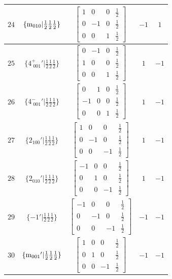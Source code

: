 \documentclass[fleqn,8pt]{jsarticle}
\begin{document}
\begin{longtable}{ccccc}
$ 24 $ & $ \{{\rm m}_{010}|\frac{1}{2} \frac{1}{2} \frac{1}{2}\} $ & $ \begin{bmatrix} 1 & 0 & 0 & \frac{1}{2} \\ 0 & -1 & 0 & \frac{1}{2} \\ 0 & 0 & 1 & \frac{1}{2} \end{bmatrix} $ & $ -1 $ & $ 1 $ \\ \hline
$ 25 $ & $ \{4^{+}_{\,\,001}{}'|\frac{1}{2} \frac{1}{2} \frac{1}{2}\} $ & $ \begin{bmatrix} 0 & -1 & 0 & \frac{1}{2} \\ 1 & 0 & 0 & \frac{1}{2} \\ 0 & 0 & 1 & \frac{1}{2} \end{bmatrix} $ & $ 1 $ & $ -1 $ \\ \hline
$ 26 $ & $ \{4^{-}_{\,\,001}{}'|\frac{1}{2} \frac{1}{2} \frac{1}{2}\} $ & $ \begin{bmatrix} 0 & 1 & 0 & \frac{1}{2} \\ -1 & 0 & 0 & \frac{1}{2} \\ 0 & 0 & 1 & \frac{1}{2} \end{bmatrix} $ & $ 1 $ & $ -1 $ \\ \hline
$ 27 $ & $ \{2{}_{100}{}'|\frac{1}{2} \frac{1}{2} \frac{1}{2}\} $ & $ \begin{bmatrix} 1 & 0 & 0 & \frac{1}{2} \\ 0 & -1 & 0 & \frac{1}{2} \\ 0 & 0 & -1 & \frac{1}{2} \end{bmatrix} $ & $ 1 $ & $ -1 $ \\ \hline
$ 28 $ & $ \{2{}_{010}{}'|\frac{1}{2} \frac{1}{2} \frac{1}{2}\} $ & $ \begin{bmatrix} -1 & 0 & 0 & \frac{1}{2} \\ 0 & 1 & 0 & \frac{1}{2} \\ 0 & 0 & -1 & \frac{1}{2} \end{bmatrix} $ & $ 1 $ & $ -1 $ \\ \hline
$ 29 $ & $ \{-1{}'|\frac{1}{2} \frac{1}{2} \frac{1}{2}\} $ & $ \begin{bmatrix} -1 & 0 & 0 & \frac{1}{2} \\ 0 & -1 & 0 & \frac{1}{2} \\ 0 & 0 & -1 & \frac{1}{2} \end{bmatrix} $ & $ -1 $ & $ -1 $ \\ \hline
$ 30 $ & $ \{{\rm m}_{001}{}'|\frac{1}{2} \frac{1}{2} \frac{1}{2}\} $ & $ \begin{bmatrix} 1 & 0 & 0 & \frac{1}{2} \\ 0 & 1 & 0 & \frac{1}{2} \\ 0 & 0 & -1 & \frac{1}{2} \end{bmatrix} $ & $ -1 $ & $ -1 $ \\ \hline

\end{longtable}
\end{document}
